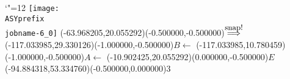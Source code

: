 \setlength{\unitlength}{1pt}%
\makeatletter%
\let\ASYencoding\f@encoding%
\let\ASYfamily\f@family%
\let\ASYseries\f@series%
\let\ASYshape\f@shape%
\makeatother%
{\catcode`"=12%
\texttt{[image: \\ASYprefix\\jobname-6\_0]}%
}%
\color{ASYcolor}%
\fontsize{12.000000}{14.400000}\selectfont%
\usefont{\ASYencoding}{\ASYfamily}{\ASYseries}{\ASYshape}%
\ASYalign(-63.968205,20.055292)(-0.500000,-0.500000){$\stackrel{\mbox{\small snap!}}{\Longrightarrow}$}%
\color{ASYcolor}%
\fontsize{12.000000}{14.400000}\selectfont%
\ASYalign(-117.033985,29.330126)(-1.000000,-0.500000){$B \leftarrow$}%
\color{ASYcolor}%
\fontsize{12.000000}{14.400000}\selectfont%
\ASYalign(-117.033985,10.780459)(-1.000000,-0.500000){$A \leftarrow$}%
\color{ASYcolor}%
\fontsize{12.000000}{14.400000}\selectfont%
\ASYalign(-10.902425,20.055292)(0.000000,-0.500000){$E$}%
\color{ASYcolor}%
\fontsize{12.000000}{14.400000}\selectfont%
\ASYalign(-94.884318,53.334760)(-0.500000,0.000000){$3$}%
